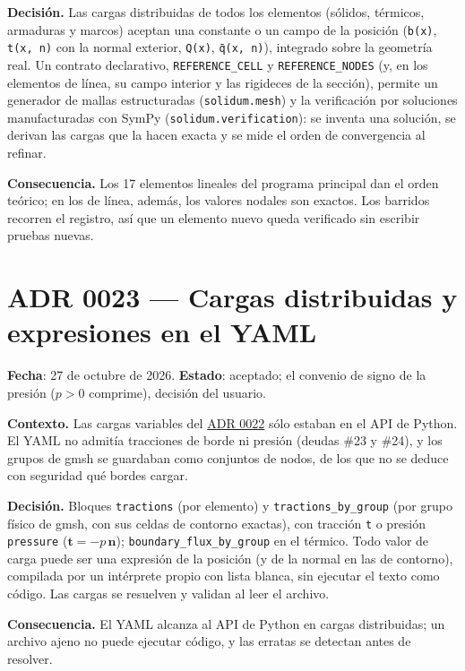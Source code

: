 \documentclass[11pt,oneside]{report}
\begin{document}
\textbf{Decisión.} Las cargas distribuidas de todos los elementos (sólidos, térmicos, armaduras y marcos) aceptan una constante o un campo de la posición (\texttt{b(x)}, \texttt{t(x, n)} con la normal exterior, \texttt{Q(x)}, \texttt{q̄(x, n)}), integrado sobre la geometría real. Un contrato declarativo, \texttt{REFERENCE\_CELL} y \texttt{REFERENCE\_NODES} (y, en los elementos de línea, su campo interior y las rigideces de la sección), permite un generador de mallas estructuradas (\texttt{solidum.mesh}) y la verificación por soluciones manufacturadas con SymPy (\texttt{solidum.\allowbreak{}verification}): se inventa una solución, se derivan las cargas que la hacen exacta y se mide el orden de convergencia al refinar.

\textbf{Consecuencia.} Los 17 elementos lineales del programa principal dan el orden teórico; en los de línea, además, los valores nodales son exactos. Los barridos recorren el registro, así que un elemento nuevo queda verificado sin escribir pruebas nuevas.

\section{ADR 0023 --- Cargas distribuidas y expresiones en el YAML}
\label{adr:0023}

\textbf{Fecha}: 27 de octubre de 2026. \textbf{Estado}: aceptado; el convenio de signo de la presión ($p > 0$ comprime), decisión del usuario.

\textbf{Contexto.} Las cargas variables del \hyperref[adr:0022]{ADR 0022} sólo estaban en el API de Python. El YAML no admitía tracciones de borde ni presión (deudas \#23 y \#24), y los grupos de gmsh se guardaban como conjuntos de nodos, de los que no se deduce con seguridad qué bordes cargar.

\textbf{Decisión.} Bloques \texttt{tractions} (por elemento) y \texttt{tractions\_\allowbreak{}by\_\allowbreak{}group} (por grupo físico de gmsh, con sus celdas de contorno exactas), con tracción \texttt{t} o presión \texttt{pressure} ($\mathbf t = -p\,\mathbf n$); \texttt{boundary\_\allowbreak{}flux\_\allowbreak{}by\_\allowbreak{}group} en el térmico. Todo valor de carga puede ser una expresión de la posición (y de la normal en las de contorno), compilada por un intérprete propio con lista blanca, sin ejecutar el texto como código. Las cargas se resuelven y validan al leer el archivo.

\textbf{Consecuencia.} El YAML alcanza al API de Python en cargas distribuidas; un archivo ajeno no puede ejecutar código, y las erratas se detectan antes de resolver.
\end{document}

